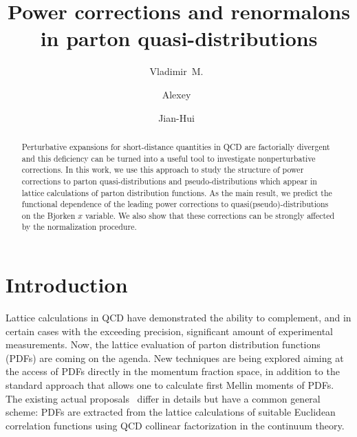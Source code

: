 \documentclass[aps,prd,twocolumn,a4paper,superscriptaddress,10pt,showpacs,notitlepage,floatfix]{revtex4-1}
\begin{document}
\allowdisplaybreaks
\begin{abstract}%
Perturbative expansions for short-distance quantities in QCD are factorially divergent and 
this deficiency can be turned into a useful tool to investigate nonperturbative corrections. In this work, we use this approach
to study the structure of power corrections to parton quasi-distributions and 
pseudo-distributions which appear in lattice calculations of parton distribution functions. As the main result, 
we predict the functional dependence of the leading power corrections to {quasi(pseudo)}-distributions on the Bjorken $x$ variable. We also show that these corrections 
can be strongly affected by the normalization procedure.
\end{abstract}

\title{Power corrections and renormalons in parton quasi-distributions}

\author{Vladimir~M.~}
\author{Alexey~}
\author{Jian-Hui~}



\maketitle
%
\section{Introduction}\label{sect_introduction1}%
%

Lattice calculations in QCD have demonstrated the ability to complement, and in certain cases with the exceeding precision, significant amount of experimental measurements.  Now, the lattice evaluation of parton distribution functions (PDFs) are coming on the agenda. New techniques are being explored aiming at the access of PDFs directly in the momentum fraction space, in addition to the standard approach that allows one to calculate first Mellin moments of PDFs. The existing actual proposals~\cite{Aglietti:1998ur,Abada:2001if,Detmold:2005gg,Braun:2007wv,Ji:2013dva,Ma:2017pxb} differ in details but have a common general scheme: PDFs are extracted from the lattice calculations of suitable Euclidean correlation functions using QCD collinear factorization in the continuum theory. 
\end{document}
